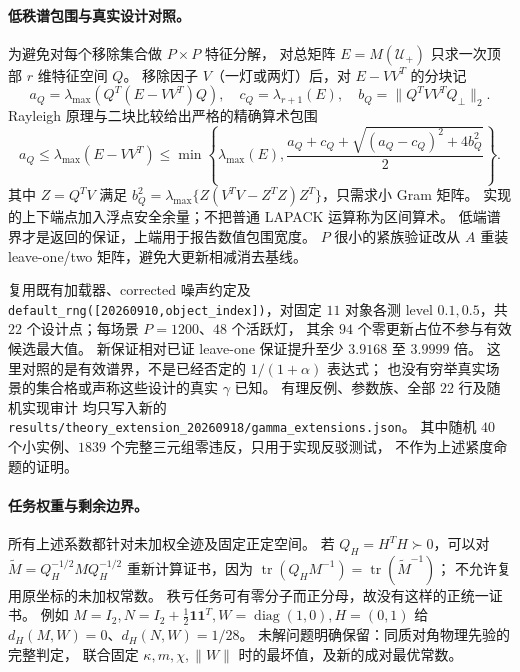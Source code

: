 \paragraph{低秩谱包围与真实设计对照。}
为避免对每个移除集合做 $P\times P$ 特征分解，
对总矩阵 $E=M(\mathcal U_+)$ 只求一次顶部 $r$ 维特征空间 $Q$。
移除因子 $V$（一灯或两灯）后，对 $E-VV^T$ 的分块记
\[
 a_Q=\lambda_{\max}(Q^T(E-VV^T)Q),\quad
 c_Q=\lambda_{r+1}(E),\quad
 b_Q=\|Q^TVV^TQ_\perp\|_2.
\]
Rayleigh 原理与二块比较给出严格的精确算术包围
\[
 a_Q\le\lambda_{\max}(E-VV^T)\le
 \min\left\{\lambda_{\max}(E),
 \frac{a_Q+c_Q+\sqrt{(a_Q-c_Q)^2+4b_Q^2}}2\right\}.
\]
其中 $Z=Q^TV$ 满足
$b_Q^2=\lambda_{\max}\{Z(V^TV-Z^TZ)Z^T\}$，只需求小 Gram 矩阵。
实现的上下端点加入浮点安全余量；不把普通 LAPACK 运算称为区间算术。
低端谱界才是返回的保证，上端用于报告数值包围宽度。
$P$ 很小的紧族验证改从 $A$ 重装 leave-one/two 矩阵，避免大更新相减消去基线。

复用既有加载器、corrected 噪声约定及
\texttt{default\_rng([20260910,object\_index])}，对固定 $11$ 对象各测
level $0.1,0.5$，共 $22$ 个设计点；每场景 $P=1200$、$48$ 个活跃灯，
其余 $94$ 个零更新占位不参与有效候选最大值。
新保证相对已证 leave-one 保证提升至少 $3.9168$ 至 $3.9999$ 倍。
这里对照的是有效谱界，不是已经否定的 $1/(1+\alpha)$ 表达式；
也没有穷举真实场景的集合格或声称这些设计的真实 $\gamma$ 已知。
有理反例、参数族、全部 $22$ 行及随机实现审计
均只写入新的
\texttt{results/theory\_extension\_20260918/gamma\_extensions.json}。
其中随机 $40$ 个小实例、$1839$ 个完整三元组零违反，只用于实现反驳测试，
不作为上述紧度命题的证明。

\paragraph{任务权重与剩余边界。}
所有上述系数都针对未加权全迹及固定正定空间。
若 $Q_H=H^TH\succ0$，可以对
$\widetilde M=Q_H^{-1/2}MQ_H^{-1/2}$ 重新计算证书，因为
$\operatorname{tr}(Q_HM^{-1})=\operatorname{tr}(\widetilde M^{-1})$；
不允许复用原坐标的未加权常数。
秩亏任务可有零分子而正分母，故没有这样的正统一证书。
例如 $M=I_2,N=I_2+\tfrac12\mathbf1\mathbf1^T,
W=\operatorname{diag}(1,0),H=(0,1)$ 给
$d_H(M,W)=0$、$d_H(N,W)=1/28$。
未解问题明确保留：同质对角物理先验的完整判定，
联合固定 $\kappa,m,\chi,\|W\|$ 时的最坏值，及新的成对最优常数。
